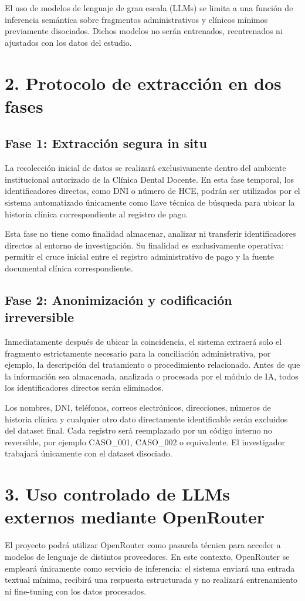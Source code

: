 \documentclass[12pt,a4paper]{article}
\begin{document}
El uso de modelos de lenguaje de gran escala (LLMs) se limita a una función de inferencia semántica sobre fragmentos administrativos y clínicos mínimos previamente disociados. Dichos modelos no serán entrenados, reentrenados ni ajustados con los datos del estudio.

\section*{2. Protocolo de extracción en dos fases}

\subsection*{Fase 1: Extracción segura in situ}
La recolección inicial de datos se realizará exclusivamente dentro del ambiente institucional autorizado de la Clínica Dental Docente. En esta fase temporal, los identificadores directos, como DNI o número de HCE, podrán ser utilizados por el sistema automatizado únicamente como llave técnica de búsqueda para ubicar la historia clínica correspondiente al registro de pago.

Esta fase no tiene como finalidad almacenar, analizar ni transferir identificadores directos al entorno de investigación. Su finalidad es exclusivamente operativa: permitir el cruce inicial entre el registro administrativo de pago y la fuente documental clínica correspondiente.

\subsection*{Fase 2: Anonimización y codificación irreversible}
Inmediatamente después de ubicar la coincidencia, el sistema extraerá solo el fragmento estrictamente necesario para la conciliación administrativa, por ejemplo, la descripción del tratamiento o procedimiento relacionado. Antes de que la información sea almacenada, analizada o procesada por el módulo de IA, todos los identificadores directos serán eliminados.

Los nombres, DNI, teléfonos, correos electrónicos, direcciones, números de historia clínica y cualquier otro dato directamente identificable serán excluidos del dataset final. Cada registro será reemplazado por un código interno no reversible, por ejemplo CASO\_001, CASO\_002 o equivalente. El investigador trabajará únicamente con el dataset disociado.

\section*{3. Uso controlado de LLMs externos mediante OpenRouter}
El proyecto podrá utilizar OpenRouter como pasarela técnica para acceder a modelos de lenguaje de distintos proveedores. En este contexto, OpenRouter se empleará únicamente como servicio de inferencia: el sistema enviará una entrada textual mínima, recibirá una respuesta estructurada y no realizará entrenamiento ni fine-tuning con los datos procesados.
\end{document}
